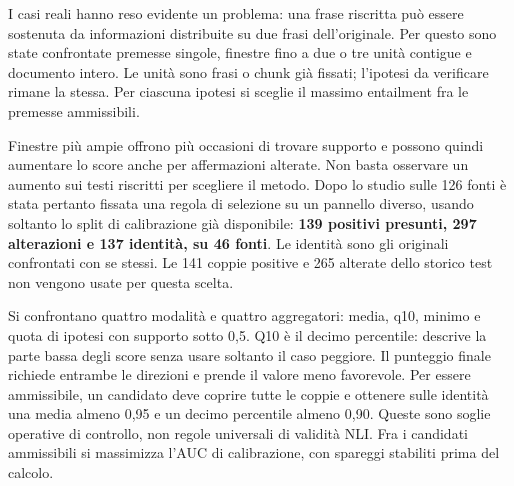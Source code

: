 \documentclass[11pt,a4paper]{article}
\begin{document}
I casi reali hanno reso evidente un problema: una frase riscritta può essere sostenuta da informazioni distribuite su due frasi dell'originale. Per questo sono state confrontate premesse singole, finestre fino a due o tre unità contigue e documento intero. Le unità sono frasi o chunk già fissati; l'ipotesi da verificare rimane la stessa. Per ciascuna ipotesi si sceglie il massimo entailment fra le premesse ammissibili.

Finestre più ampie offrono più occasioni di trovare supporto e possono quindi aumentare lo score anche per affermazioni alterate. Non basta osservare un aumento sui testi riscritti per scegliere il metodo. Dopo lo studio sulle 126 fonti è stata pertanto fissata una regola di selezione su un pannello diverso, usando soltanto lo split di calibrazione già disponibile: \textbf{139 positivi presunti, 297 alterazioni e 137 identità, su 46 fonti}. Le identità sono gli originali confrontati con se stessi. Le 141 coppie positive e 265 alterate dello storico test non vengono usate per questa scelta.

Si confrontano quattro modalità e quattro aggregatori: media, q10, minimo e quota di ipotesi con supporto sotto 0,5. Q10 è il decimo percentile: descrive la parte bassa degli score senza usare soltanto il caso peggiore. Il punteggio finale richiede entrambe le direzioni e prende il valore meno favorevole. Per essere ammissibile, un candidato deve coprire tutte le coppie e ottenere sulle identità una media almeno 0,95 e un decimo percentile almeno 0,90. Queste sono soglie operative di controllo, non regole universali di validità NLI. Fra i candidati ammissibili si massimizza l'AUC di calibrazione, con spareggi stabiliti prima del calcolo.
\end{document}
